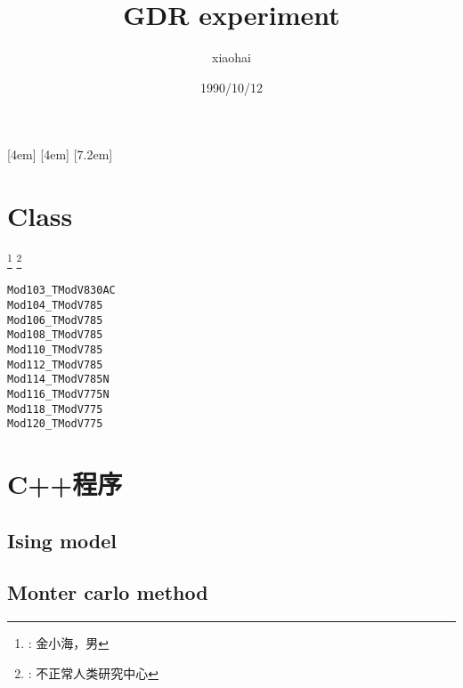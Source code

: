 \documentclass[11pt,UTF8,hyperref,openany]{ctexbook}
\author{xiaohai}
\date{1990/10/12}
\title{GDR experiment}
\begin{document}

\maketitle

[4em]{\addvspace{2.3mm}\bf}{%
  \contentslabel{4.0em}}{}{\titlerule*[5pt]{$\cdot$}\contentspage}
[4em]{}{\contentslabel{2.5em}}{}{%
  \titlerule*[5pt]{$\cdot$}\contentspage}
[7.2em]{}{\contentslabel{3.3em}}{}{%
  \titlerule*[5pt]{$\cdot$}\contentspage}
\tableofcontents

\listoffigures
\listoftables

\chapter{Class}
\renewcommand{\thefootnote}{}
\footnote{: 金小海，男}
\footnote{: 不正常人类研究中心}
\setcounter{footnote}{0}
\renewcommand{\thefootnote}{\arabic{footnote}}
\begin{verbatim}
Mod103_TModV830AC
Mod104_TModV785
Mod106_TModV785
Mod108_TModV785
Mod110_TModV785
Mod112_TModV785
Mod114_TModV785N
Mod116_TModV775N
Mod118_TModV775
Mod120_TModV775
\end{verbatim}



\appendix
\chapter{C++程序}
\section{Ising model}
\section{Monter carlo method}



\end{document}
